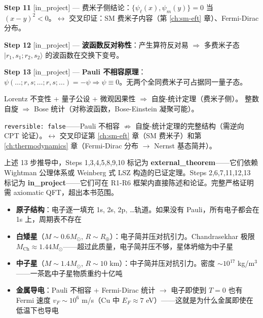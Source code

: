 \begin{derivationbox}
\noindent\textbf{Step 11} [in\_project] — 费米子侧结论：$\{\psi_\ell(x),\psi_m(y)\}=0$ 当 $(x-y)^2<0$。$\leftrightarrow$ 交叉印证：SM 费米子内容（第 \ref{ch:sm-eft} 章）、Fermi-Dirac 分布。

\noindent\textbf{Step 12} [in\_project] — \textbf{波函数反对称性}：产生算符反对易 $\Rightarrow$ 多费米子态 $|r_1,s_1;r_2,s_2\rangle$ 的波函数在交换下变号。

\noindent\textbf{Step 13} [in\_project] — \textbf{Pauli 不相容原理}：$\psi(\ldots;r,s;\ldots;r,s;\ldots)=-\psi\Rightarrow\psi\equiv0$。无两个全同费米子可占据同一量子态。

\end{derivationbox}

\fbox{[S]} Lorentz 不变性 + 量子公设 + 微观因果性 $\Rightarrow$ 自旋-统计定理（费米子侧）。
\fbox{[S]} 整数自旋 $\Rightarrow$ Bose 统计（对称波函数，Bose-Einstein 凝聚可能）。

\texttt{reversible: false}——Pauli 不相容 $\not\Rightarrow$ 自旋-统计定理的完整结构（需逆向 CPT 论证）。$\leftrightarrow$ 交叉印证第 \ref{ch:sm-eft} 章（SM 费米子）和第 \ref{ch:thermodynamics} 章（Fermi-Dirac 分布 $\to$ Nernst 基态简并）。

\begin{notebox}
  上述 13 步推导中，Steps 1,3,4,5,8,9,10 标记为 \textbf{external\_theorem}——它们依赖 Wightman 公理体系或 Weinberg 式 LSZ 构造的已证定理。Steps 2,6,7,11,12,13 标记为 \textbf{in\_project}——它们可在 R1-R6 框架内直接陈述和论证。完整严格证明需 axiomatic QFT，超出本书范围。
\end{notebox}


\begin{oombox}
  \begin{itemize}
    \item \textbf{原子结构}：电子逐一填充 1s, 2s, 2p, \ldots 轨道。如果没有 Pauli，所有电子都会在 1s 上，周期表不存在
    \item \textbf{白矮星}（$M \sim 0.6M_\odot$, $R \sim R_\oplus$）：电子简并压对抗引力。Chandrasekhar 极限 $M_{\text{Ch}} \approx 1.44 M_\odot$——超过此质量，电子简并压不够，星体坍缩为中子星
    \item \textbf{中子星}（$M \sim 1.4M_\odot$, $R \sim 10$ km）：中子简并压对抗引力。密度 $\sim 10^{17}$ kg/m$^3$——一茶匙中子星物质重约十亿吨
    \item \textbf{金属导电}：Pauli 不相容 + Fermi-Dirac 统计 $\to$ 电子即使到 $T=0$ 也有 Fermi 速度 $v_F \sim 10^6$ m/s（Cu 中 $E_F \approx 7$ eV）——这就是为什么金属即使在低温下也导电
  \end{itemize}
\end{oombox}


